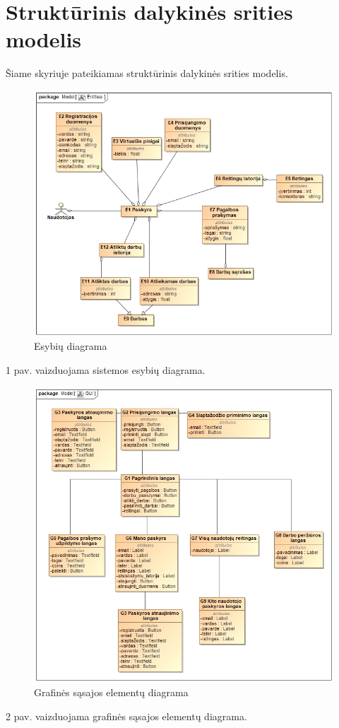 \documentclass{VUMIFPSbakalaurinis}
\begin{document}
\section{Struktūrinis dalykinės srities modelis}
Šiame skyriuje pateikiamas struktūrinis dalykinės srities modelis.
\begin{figure}[H]
    \centering
    \includegraphics[scale=0.7]{img/Entities}
    \caption{Esybių diagrama}
    \label{img:entities}
\end{figure}
1 pav. vaizduojama sistemos esybių diagrama.
\begin{figure}[H]
    \centering
    \includegraphics[scale=0.7]{img/GUI}
    \caption{Grafinės sąsajos elementų diagrama}
    \label{img:gui}
\end{figure}
2 pav. vaizduojama grafinės sąsajos elementų diagrama. 
\end{document}
